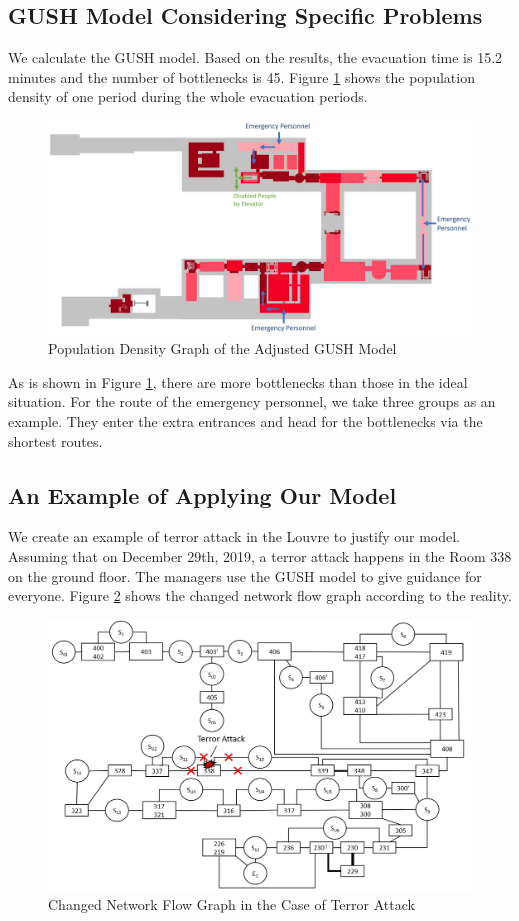 \documentclass[a4paper,12pt]{article}
\begin{document}
\subsection{GUSH Model Considering Specific Problems}
We calculate the GUSH model. Based on the results, the evacuation time is 15.2 minutes and the number of bottlenecks is 45. Figure \ref{fig5-4} shows the population density of one period during the whole evacuation periods.
\begin{figure} [H]
\centering
\includegraphics[width=15cm]{ttest.jpg}
\caption{Population Density Graph of the Adjusted GUSH Model}
\label{fig5-4}
\end{figure}

As is shown in Figure \ref{fig5-4}, there are more bottlenecks than those in the ideal situation. For the route of the emergency personnel, we take three groups as an example. They enter the extra entrances and head for the bottlenecks via the shortest routes.
\subsection{An Example of Applying Our Model}
We create an example of terror attack in the Louvre to justify our model. Assuming that on December 29th, 2019, a terror attack happens in the Room 338 on the ground floor. The managers use the GUSH model to give guidance for everyone. Figure \ref{fig5-5} shows the changed network flow graph according to the reality. 

\begin{figure} [H]
\centering
\includegraphics[width=15cm]{floor_0_new_new.jpg}
\caption{Changed Network Flow Graph in the Case of Terror Attack}
\label{fig5-5}
\end{figure}
\end{document}
